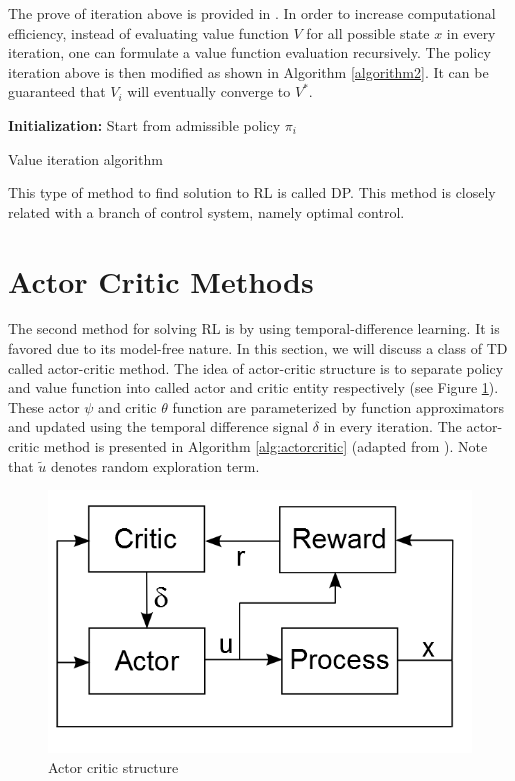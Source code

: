 The prove of iteration above is provided in \cite{Bertsekas}. In order to increase computational efficiency, instead of evaluating value function $V$ for all possible state $x$ in every iteration, one can formulate a value function evaluation recursively. The policy iteration above is then modified as shown in Algorithm \ref{algorithm2}. It can be guaranteed that $V_i$ will eventually converge to $V^*$.

\begin{algorithm}[H]
	\textbf{Initialization:} Start from admissible policy $ \pi_{i} $\\
	\label{algorithm2}
	\caption{Value iteration algorithm}
\end{algorithm}

This type of method to find solution to \ac{RL} is called \ac{DP}. This method is closely related with a branch of control system, namely optimal control.
 
\section{Actor Critic Methods} \label{sec:actor}
The second method for solving \ac{RL} is by using temporal-difference learning. It is favored due to its model-free nature. In this section, we will discuss a class of \ac{TD} called actor-critic method. The idea of actor-critic structure is to separate policy and value function into called actor and critic entity respectively (see Figure \ref{fig:actorCritic}). These actor $\psi$ and critic $\theta$ function are parameterized by function approximators and updated using the temporal difference signal $\delta$ in every iteration. The actor-critic method is presented in Algorithm \ref{alg:actorcritic} (adapted from \cite{babuskaRL}). Note that $\tilde{u}$ denotes random exploration term.

\begin{figure}[h!]
\centering
\includegraphics[width=0.6\linewidth]{actorCritic2}
\caption{Actor critic structure} 
\label{fig:actorCritic}
\end{figure}

